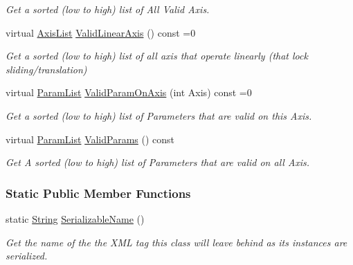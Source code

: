 \begin{DoxyCompactItemize}
\begin{DoxyCompactList}\small\item\em Get a sorted (low to high) list of All Valid Axis. \item\end{DoxyCompactList}\item 
virtual \hyperlink{classMezzanine_1_1TypedConstraint_ac6b8e0839cd686f73d0c9e9ad5db47a4}{AxisList} \hyperlink{classMezzanine_1_1TypedConstraint_aa9cc59688e58329ce18cc3e024094602}{ValidLinearAxis} () const =0
\begin{DoxyCompactList}\small\item\em Get a sorted (low to high) list of all axis that operate linearly (that lock sliding/translation) \item\end{DoxyCompactList}\item 
virtual \hyperlink{classMezzanine_1_1TypedConstraint_abd499db29c9e9755e9bb547d29eaa49a}{ParamList} \hyperlink{classMezzanine_1_1TypedConstraint_a3f895880ea78984a088996e1950fddcc}{ValidParamOnAxis} (int Axis) const =0
\begin{DoxyCompactList}\small\item\em Get a sorted (low to high) list of Parameters that are valid on this Axis. \item\end{DoxyCompactList}\item 
virtual \hyperlink{classMezzanine_1_1TypedConstraint_abd499db29c9e9755e9bb547d29eaa49a}{ParamList} \hyperlink{classMezzanine_1_1TypedConstraint_a278d3baf36055e5d10a411139a2d2a7e}{ValidParams} () const 
\begin{DoxyCompactList}\small\item\em Get A sorted (low to high) list of Parameters that are valid on all Axis. \item\end{DoxyCompactList}\end{DoxyCompactItemize}
\subsubsection*{Static Public Member Functions}
\begin{DoxyCompactItemize}
\item 
static \hyperlink{namespaceMezzanine_acf9fcc130e6ebf08e3d8491aebcf1c86}{String} \hyperlink{classMezzanine_1_1TypedConstraint_accc0475bacd0b984dd30d74dbe2bc08e}{SerializableName} ()
\begin{DoxyCompactList}\small\item\em Get the name of the the XML tag this class will leave behind as its instances are serialized. \item\end{DoxyCompactList}\end{DoxyCompactItemize}
